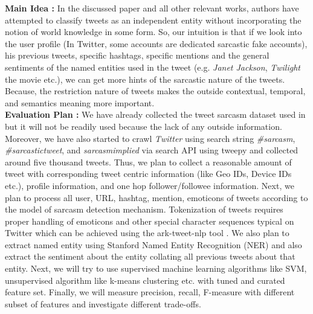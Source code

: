 \noindent \textbf{Main Idea :} In the discussed paper and all other relevant works, authors have attempted to classify tweets as an independent entity without incorporating the notion of world knowledge in some form. So, our intuition is that if we look into the user profile (In Twitter, some accounts are dedicated sarcastic fake accounts), his previous tweets, specific hashtags, specific mentions and the general sentiments of the named entities used in the tweet (e.g. \textit{Janet Jackson}, \textit{Twilight} the movie etc.), we can get more hints of the sarcastic nature of the tweets. Because, the restriction nature of tweets makes the outside contextual, temporal, and semantics meaning more important.\\

\noindent \textbf{Evaluation Plan :}
We have already collected the tweet sarcasm dataset used in \cite{davidov10} but it will not be readily used because the lack of any outside information. Moreover, we have also started to crawl \textit{Twitter} using search string \textit{\#sarcasm}, \textit{\#sarcastictweet}, and \textit{sarcasmimplied} via search API using tweepy\cite{tweepy} and collected around five thousand tweets. Thus, we plan to collect a reasonable amount of tweet with corresponding tweet centric information (like Geo IDs, Device IDs etc.), profile information, and one hop follower/followee information. Next, we plan to process all user, URL, hashtag, mention, emoticons of tweets according to the model of sarcasm detection mechanism. Tokenization of tweets requires proper handling of emoticons and other special character sequences
typical on Twitter which can be achieved using the ark-tweet-nlp tool \cite{gimpel11}. We also plan to extract named entity using Stanford Named Entity Recognition (NER) and also extract the sentiment about the entity collating all previous tweets about that entity. Next, we will try to use supervised machine learning algorithms like SVM, unsupervised algorithm like k-means clustering etc. with tuned and curated feature set. Finally, we will measure precision, recall, F-measure with different subset of features and investigate different trade-offs. 

